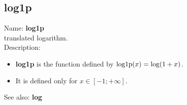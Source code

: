\subsection{ log1p }
\noindent Name: \textbf{log1p}\\
translated logarithm.\\

\noindent Description: \begin{itemize}

\item \textbf{log1p} is the function defined by ${\rm log1p}(x) = \log(1+x)$.

\item It is defined only for $x \in [-1; +\infty]$.
\end{itemize}
See also: \textbf{log}
